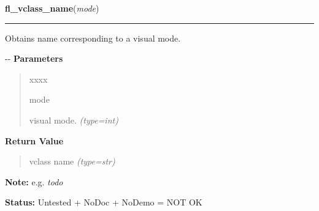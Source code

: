     \label{xformslib:flxbasic:fl_vclass_name}

    \vspace{0.5ex}

\hspace{.8\funcindent}\begin{boxedminipage}{\funcwidth}

    \raggedright \textbf{fl\_vclass\_name}(\textit{mode})

    \vspace{-1.5ex}

    \rule{\textwidth}{0.5\fboxrule}
\setlength{\parskip}{2ex}

Obtains name corresponding to a visual mode.

-{}-
\setlength{\parskip}{1ex}
      \textbf{Parameters}
      \vspace{-1ex}

      \begin{quote}
        \begin{Ventry}{xxxx}

          \item[mode]


visual mode.
            {\it (type=int)}

        \end{Ventry}

      \end{quote}

      \textbf{Return Value}
    \vspace{-1ex}

      \begin{quote}

vclass name
      {\it (type=str)}

      \end{quote}

\textbf{Note:} 
e.g. \emph{todo}


\textbf{Status:} 
Untested + NoDoc + NoDemo = NOT OK


    \end{boxedminipage}

    \label{xformslib:flxbasic:fl_vclass_val}

    \vspace{0.5ex}

